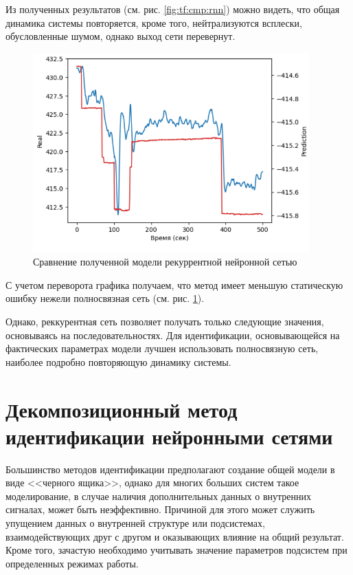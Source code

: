 Из полученных результатов (см. рис. \ref{fig:tf:cmp:rnn}) можно видеть, что
общая динамика системы повторяется, кроме того, нейтрализуются всплески,
обусловленные шумом, однако выход сети перевернут. 

\begin{figure}[H]
  \begin{center}
    \includegraphics[width=0.95\textwidth]{figures/tensorflow/rnn_compare_reversed.png}
  \end{center}
  \caption{Сравнение полученной модели рекуррентной нейронной
  сетью}\label{fig:tf:cmp:rnn:reversed}
\end{figure}

С учетом переворота графика получаем, что метод имеет меньшую статическую
ошибку нежели полносвязная сеть (см. рис. \ref{fig:tf:cmp:rnn:reversed}).

Однако, реккурентная сеть позволяет получать только следующие значения,
основываясь на последовательностях. Для идентификации, основывающейся на
фактических параметрах модели лучшен использовать полносвязную сеть, наиболее подробно повторяющую динамику системы. 

\section{Декомпозиционный метод идентификации нейронными сетями}
Большинство методов идентификации предполагают создание общей модели в виде
<<черного ящика>>, однако для многих больших систем такое моделирование, в
случае наличия дополнительных данных о внутренних сигналах, может быть
неэффективно. Причиной для этого может служить упущением данных о внутренней
структуре или подсистемах, взаимодействующих друг с другом и оказывающих
влияние на общий результат. Кроме того, зачастую необходимо учитывать значение
параметров подсистем при определенных режимах работы.

